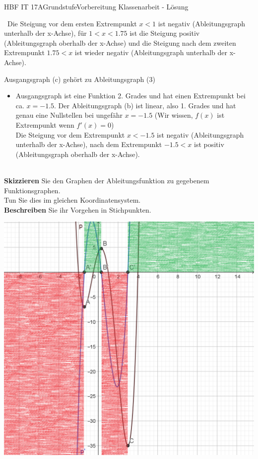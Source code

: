 \documentclass[oneside,openany,headings=optiontotoc,11pt,numbers=noenddot]{scrreprt}
\begin{document}
\begin{worksheet}{HBF IT 17A}{Grundstufe}{Vorbereitung Klassenarbeit - Lösung}
\begin{framed}
\begin{itemize}
\
 				Die Steigung vor dem ersten Extrempunkt \(x<1\) ist negativ (Ableitungsgraph unterhalb der x-Achse), für \(1 < x < 1.75\) ist die Steigung positiv (Ableitungsgraph oberhalb der x-Achse) und die Steigung nach dem zweiten Extrempunkt \(1.75<x\) ist wieder negativ (Ableitungsgraph unterhalb der x-Achse).
			\end{itemize}
			Ausgangsgraph (c) gehört zu Ableitungsgraph (3)
			\begin{itemize}
				\item Ausgangsgraph ist eine Funktion 2. Grades und hat einen Extrempunkt bei ca. \(x=-1.5\). Der Ableitungsgraph (b) ist linear, also 1. Grades und hat genau eine Nullstellen bei ungefähr \(x=-1.5\) (Wir wissen, \(f(x) \) ist Extrempunkt wenn \(f'(x)=0\))\\
				Die Steigung vor dem Extrempunkt \(x<-1.5\) ist negativ (Ableitungsgraph unterhalb der x-Achse), nach dem Extrempunkt \(-1.5<x\) ist positiv (Ableitungsgraph oberhalb der x-Achse).
			\end{itemize}
			\hdashrule[0.5ex][x]{\textwidth}{0.1mm}{8mm 2pt}\\
			\textbf{Skizzieren} Sie den Graphen der Ableitungsfunktion zu gegebenem Funktionsgraphen.\\
			Tun Sie dies im gleichen Koordinatensystem.\\
			\textbf{Beschreiben} Sie ihr Vorgehen in Stichpunkten.\\
			\begin{center}
				\includegraphics[scale=0.6]{Bilder/pp'ue.png}

\end{center}
\end{framed}
\end{worksheet}
\end{document}
